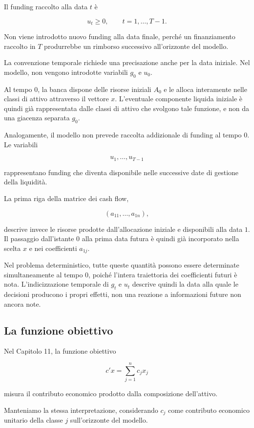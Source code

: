 Il funding raccolto alla data $t$ \`e

\[
u_t\geq0,
\qquad
t=1,\ldots,T-1.
\]

Non viene introdotto nuovo funding alla data finale, perch\'e un finanziamento
raccolto in $T$ produrrebbe un rimborso successivo all'orizzonte del modello.

La convenzione temporale richiede una precisazione anche per la data iniziale.
Nel modello, non vengono introdotte variabili $g_0$ e $u_0$.

Al tempo $0$, la banca dispone delle risorse iniziali $A_0$ e le alloca
interamente nelle classi di attivo attraverso il vettore $x$. L'eventuale
componente liquida iniziale \`e quindi gi\`a rappresentata dalle classi di
attivo che svolgono tale funzione, e non da una giacenza separata $g_0$.

Analogamente, il modello non prevede raccolta addizionale di funding al tempo
$0$. Le variabili

\[
u_1,\ldots,u_{T-1}
\]

\noindent rappresentano funding che diventa disponibile nelle successive date di
gestione della liquidit\`a.

La prima riga della matrice dei cash flow,

\[
(a_{11},\ldots,a_{1n}),
\]

\noindent descrive invece le risorse prodotte dall'allocazione iniziale e disponibili
alla data $1$. Il passaggio dall'istante $0$ alla prima data futura \`e
quindi gi\`a incorporato nella scelta $x$ e nei coefficienti $a_{1j}$.

Nel problema deterministico, tutte queste quantit\`a possono essere determinate
simultaneamente al tempo $0$, poich\'e l'intera traiettoria dei coefficienti
futuri \`e nota. L'indicizzazione temporale di $g_t$ e $u_t$ descrive quindi
la data alla quale le decisioni producono i propri effetti, non una reazione
a informazioni future non ancora note.

\subsection{La funzione obiettivo}

Nel Capitolo 11, la funzione obiettivo

\[
c'x
=
\sum_{j=1}^{n}c_jx_j
\]

\noindent misura il contributo economico prodotto dalla composizione dell'attivo.

Manteniamo la stessa interpretazione, considerando $c_j$ come contributo
economico unitario della classe $j$ sull'orizzonte del modello.

